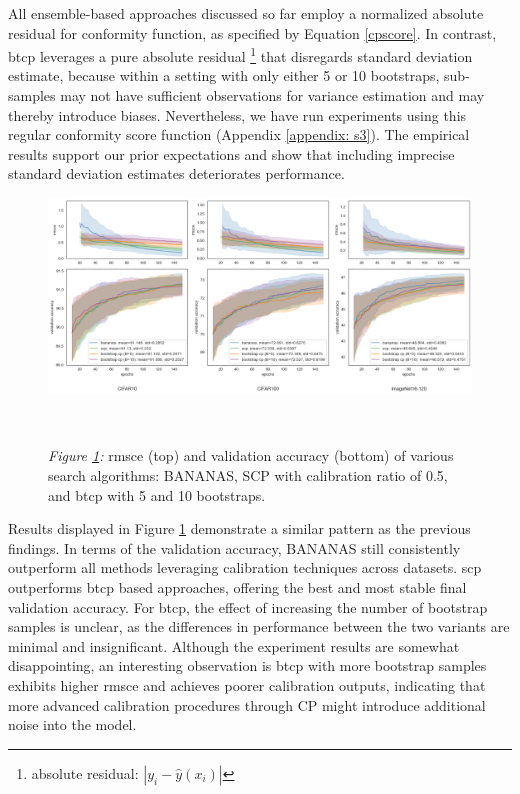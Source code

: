 \documentclass[a4paper,oneside,bibliography=totoc]{scrbook}
\begin{document}
\begin{description}[leftmargin=0cm, listparindent=\parindent]
		All ensemble-based approaches discussed so far employ a normalized absolute residual for conformity function, as specified by Equation \ref{cpscore}. In contrast, \gls{btcp} leverages a pure absolute residual \footnote{absolute residual: $|y_i - \hat{y}(x_i)|$} that disregards standard deviation estimate, because within a setting with only either 5 or 10 bootstraps, sub-samples may not have sufficient observations for variance estimation and may thereby introduce biases. Nevertheless, we have run experiments using this regular conformity score function (Appendix \ref{appendix: s3}). The empirical results support our prior expectations and show that including imprecise standard deviation estimates deteriorates performance.
	
	\vspace{0.3em}
	\begin{figure}[H]
		\centering
		\includegraphics[scale=0.37 ]{figs/bootstrap.png}
		\label{fig: btcp}
		\\
 		\parbox{\linewidth}{
		\vspace{1em}
 	  		{\small \textit{Figure \ref{fig: btcp}:} \gls{rmsce} (top) and validation accuracy (bottom) of various search algorithms: BANANAS, SCP with calibration ratio of 0.5, and \gls{btcp} with 5 and 10 bootstraps.}
 	 	}	
	\end{figure}	 
	
	Results displayed in Figure \ref{fig: btcp} demonstrate a similar pattern as the previous findings. In terms of the validation accuracy, BANANAS still consistently outperform all methods leveraging calibration techniques across datasets. \gls{scp} outperforms \gls{btcp} based approaches, offering the best and most stable final validation accuracy. For \gls{btcp}, the effect of increasing the number of bootstrap samples is unclear, as the differences in performance between the two variants are minimal and insignificant. Although the experiment results are somewhat disappointing, an interesting observation is \gls{btcp} with more bootstrap samples exhibits higher \gls{rmsce} and achieves poorer calibration outputs, indicating that more advanced calibration procedures through CP might introduce additional noise into the model.
		

\end{description}
\end{document}
